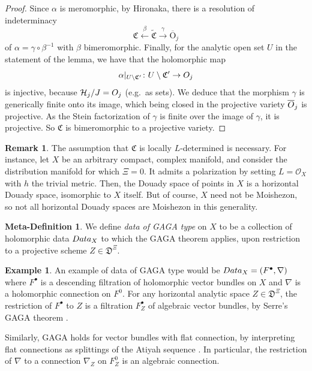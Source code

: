 \documentclass[10pt,letterpaper,english,reqno]{amsart}
\numberwithin{equation}{subsection}
\newcommand\cH{{\mathcal H}}
\newcommand\cO{{\mathcal O}}
\newcommand\fC{{\mathfrak C}}
\newcommand\fD{{\mathfrak D}}
\newcommand\oO{{\overline O}}
\theoremstyle{definition}
\newtheorem{example}[theorem]{Example}
\newtheorem{metadefinition}[theorem]{Meta-Definition}
\newtheorem{remark}[theorem]{Remark}
\begin{document}
\begin{proof}
Since $\alpha$ is meromorphic, by Hironaka,
there is a resolution of indeterminacy
$$\fC\xleftarrow{\beta} \widetilde{\fC}\xrightarrow{\gamma} 
{\mathrm \oO}_j$$ 
of $\alpha=\gamma\circ \beta^{-1}$ with $\beta$
bimeromorphic. Finally, for the analytic
open set $U$ in the statement of the lemma, we
have that the holomorphic map
$$\alpha\vert_{U\setminus \fC'}\colon 
U\setminus \fC'\to {\rm O}_j$$ is injective,
because $\cH_j/J={\rm O}_j$ (e.g.~as sets). We deduce
that the morphism $\gamma$ is generically finite
onto its image, which being closed in the projective
variety ${\rm \oO}_j$ is projective.
As the Stein factorization of $\gamma$ 
is finite over the image of $\gamma$, 
it is projective.
So $\fC$ is bimeromorphic to
a projective variety.
\end{proof}

\begin{remark} The assumption that $\fC$ is locally $L$-determined is necessary.
For instance, let $X$ be an arbitrary compact, complex manifold,
and consider the distribution manifold for which $\Xi=0$. It admits
a polarization by setting $L=\cO_X$ with $h$ the trivial metric.
Then, the Douady space of points in $X$ is a horizontal Douady space,
isomorphic to $X$ itself. But of course, $X$ need not be Moishezon,
so not all horizontal Douady spaces are Moishezon in this generality.
\end{remark}

\begin{metadefinition}\label{data of GAGA type} We define {\it data of GAGA type} 
on $X$ to be a collection of holomorphic data ${\rm Data}_X$
to which the GAGA theorem applies, upon restriction
to a projective scheme $Z\in \fD^{\Xi}$.
\end{metadefinition}

\begin{example} An example of data of GAGA type would be
${\rm Data}_X = (F^\bullet, \nabla)$ where $F^\bullet$
is a descending filtration of holomorphic vector bundles on
$X$ and $\nabla$ is a holomorphic connection on $F^0$.
For any horizontal analytic space $Z\in \fD^{\Xi}$,
the restriction of $F^\bullet$ to $Z$ is a filtration
$F^\bullet_Z$ of algebraic vector bundles, by Serre's GAGA theorem \cite{gaga}.

Similarly, GAGA
holds for vector bundles with flat
connection, by interpreting
flat connections as splittings
of the Atiyah sequence
\cite[I.2.3]{deligneed}. In
particular, 
the restriction of $\nabla$ to a
connection $\nabla_Z$ on $F^0_Z$
is an algebraic connection.
\end{example}
\end{document}
